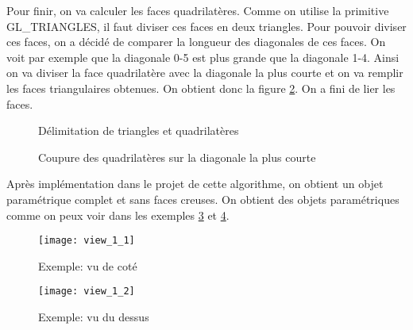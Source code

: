 \documentclass[article, backcover, french, nodocumentinfo]{upmethodology-document}
\begin{document}
		Pour finir, on va calculer les faces quadrilatères. Comme on utilise la primitive GL\_TRIANGLES, il faut diviser ces faces en deux triangles. Pour pouvoir diviser ces faces, on a décidé de comparer la longueur des diagonales de ces faces. On voit par exemple que la diagonale 0-5 est plus grande que la diagonale 1-4. Ainsi on va diviser la face quadrilatère avec la diagonale la plus courte et on va remplir les faces triangulaires obtenues. On obtient donc la figure \ref{fig:layers_4_quadrilaterals_diagonals}. On a fini de lier les faces.
		\par\noindent\begin{minipage}[t]{\textwidth}
			\centering
			\begin{minipage}[t]{0.49\textwidth}
				\begin{figure}[H]
					\centering%
					\caption{Délimitation de triangles et quadrilatères}
					\label{fig:layers_3_triangles_quadrilaterals}%
				\end{figure}
			\end{minipage}
			\begin{minipage}[t]{0.49\textwidth}
				\begin{figure}[H]
					\centering%
					\caption{Coupure des quadrilatères sur la diagonale la plus courte}%
					\label{fig:layers_4_quadrilaterals_diagonals}%
				\end{figure}
			\end{minipage}
		\end{minipage}
		
		Après implémentation dans le projet de cette algorithme, on obtient un objet paramétrique complet et sans faces creuses. On obtient des objets paramétriques comme on peux voir dans les exemples \ref{fig:view_1_1} et \ref{fig:view_1_2}.
		\par\noindent\begin{minipage}[t]{\textwidth}
			\centering
			\begin{minipage}[t]{0.49\textwidth}
				\begin{figure}[H]
					\centering%
					\texttt{[image: view\_1\_1]}%
					\caption{Exemple: vu de coté}%
					\label{fig:view_1_1}%
				\end{figure}
			\end{minipage}
			\begin{minipage}[t]{0.49\textwidth}
				\begin{figure}[H]
					\centering%
					\texttt{[image: view\_1\_2]}%
					\caption{Exemple: vu du dessus}%
					\label{fig:view_1_2}%
				\end{figure}
			\end{minipage}
		\end{minipage}
\end{document}
